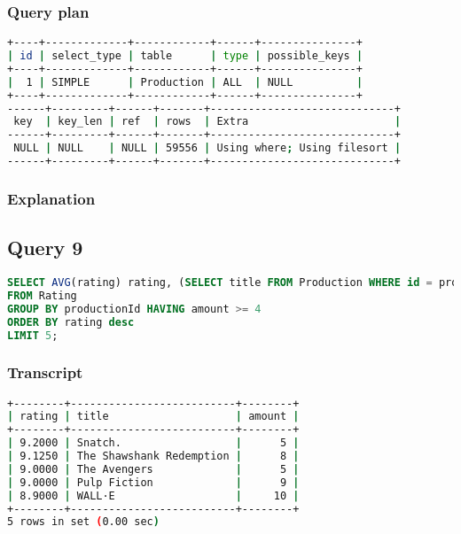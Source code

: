 \subsubsection{Query plan}
\begin{lstlisting}[language=bash]
+----+-------------+------------+------+---------------+
| id | select_type | table      | type | possible_keys |
+----+-------------+------------+------+---------------+
|  1 | SIMPLE      | Production | ALL  | NULL          |
+----+-------------+------------+------+---------------+
------+---------+------+-------+-----------------------------+
 key  | key_len | ref  | rows  | Extra                       |
------+---------+------+-------+-----------------------------+
 NULL | NULL    | NULL | 59556 | Using where; Using filesort |
------+---------+------+-------+-----------------------------+
\end{lstlisting}

\subsubsection{Explanation}


\subsection{Query 9}
\begin{lstlisting}[language=sql]
SELECT AVG(rating) rating, (SELECT title FROM Production WHERE id = productionId) title, COUNT(*) amount
FROM Rating
GROUP BY productionId HAVING amount >= 4
ORDER BY rating desc
LIMIT 5;
\end{lstlisting}
\subsubsection{Transcript}
\begin{lstlisting}[language=bash]
+--------+--------------------------+--------+
| rating | title                    | amount |
+--------+--------------------------+--------+
| 9.2000 | Snatch.                  |      5 |
| 9.1250 | The Shawshank Redemption |      8 |
| 9.0000 | The Avengers             |      5 |
| 9.0000 | Pulp Fiction             |      9 |
| 8.9000 | WALL·E                   |     10 |
+--------+--------------------------+--------+
5 rows in set (0.00 sec)
\end{lstlisting}

